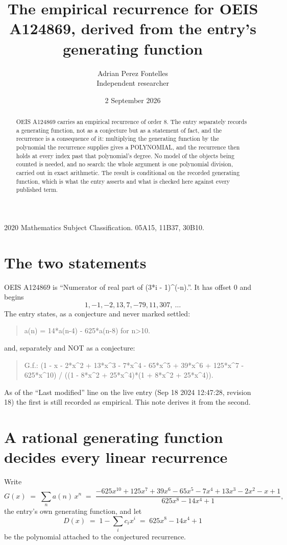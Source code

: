 \documentclass[11pt,a4paper]{article}
\title{The empirical recurrence for OEIS A124869, derived from the entry's generating function}
\author{Adrian Perez Fontelles\\ \small Independent researcher}
\date{2 September 2026}
\theoremstyle{plain}
\theoremstyle{definition}
\begin{document}
\maketitle

\begin{abstract}
OEIS A124869 carries an empirical recurrence of order $8$. The entry separately records a
generating function, not as a conjecture but as a statement of fact, and the recurrence is a
consequence of it: multiplying the generating function by the polynomial the recurrence
supplies gives a POLYNOMIAL, and the recurrence then holds at every index past that
polynomial's degree. No model of the objects being counted is needed, and no search: the
whole argument is one polynomial division, carried out in exact arithmetic. The result is
conditional on the recorded generating function, which is what the entry asserts and what is
checked here against every published term.
\end{abstract}

\noindent\small 2020 Mathematics Subject Classification. 05A15, 11B37, 30B10.\normalsize

\section{The two statements}

OEIS A124869 is ``Numerator of real part of (3*i - 1)\^{}(-n).''. It has offset $0$ and begins
\[
1, -1, -2, 13, 7, -79, 11, 307,\ \dots
\]
The entry states, as a conjecture and never marked settled:
\begin{quote}
a(n) = 14*a(n-4) - 625*a(n-8) for n>10.
\end{quote}
and, separately and NOT as a conjecture:
\begin{quote}
G.f.: (1 - x - 2*x\^{}2 + 13*x\^{}3 - 7*x\^{}4 - 65*x\^{}5 + 39*x\^{}6 + 125*x\^{}7 - 625*x\^{}10) / ((1 - 8*x\^{}2 + 25*x\^{}4)*(1 + 8*x\^{}2 + 25*x\^{}4)).
\end{quote}
As of the ``Last modified'' line on the live entry (Sep 18 2024 12:47:28, revision 18) the first is still
recorded as empirical. This note derives it from the second.

\section{A rational generating function decides every linear recurrence}

Write
\[
G(x)\;=\;\sum_{n}a(n)\,x^{n}\;=\;\frac{- 625 x^{10} + 125 x^{7} + 39 x^{6} - 65 x^{5} - 7 x^{4} + 13 x^{3} - 2 x^{2} - x + 1}{625 x^{8} - 14 x^{4} + 1},
\]
the entry's own generating function, and let
\[
D(x)\;=\;1-\sum_i c_i x^{i}\;=\;625 x^{8} - 14 x^{4} + 1
\]
be the polynomial attached to the conjectured recurrence.
\end{document}
